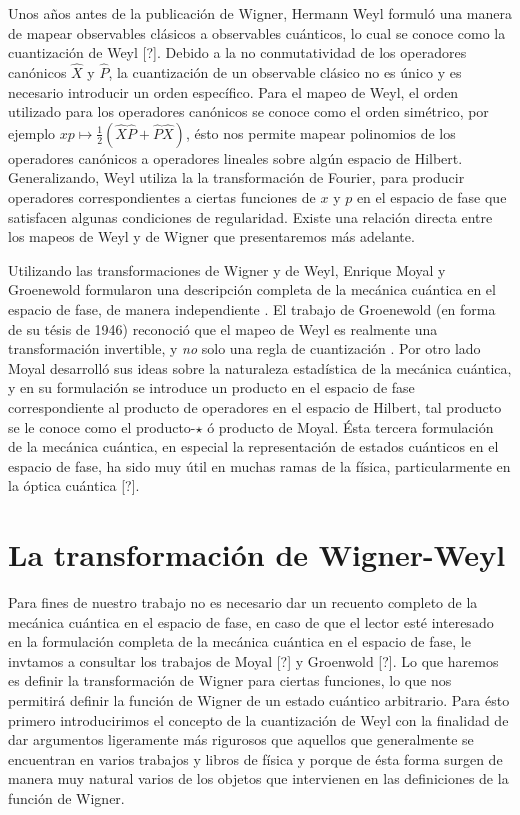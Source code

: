 \documentclass[a4paper]{report}
\begin{document}
  Unos años antes de la publicación de Wigner, Hermann Weyl
  formuló una manera de mapear observables clásicos a
  observables cuánticos, lo cual se conoce como la
  cuantización de Weyl [?]. Debido a la no conmutatividad de
  los operadores canónicos $\hat X$ y $\hat P$, la
  cuantización de un observable clásico no es único y es
  necesario introducir un orden específico. Para el mapeo de
  Weyl, el orden utilizado para los operadores canónicos se
  conoce como el orden simétrico, por ejemplo $xp \mapsto
  \frac{1}{2}\left( \hat{X} \hat{P} + \hat{P} \hat{X}
  \right)$, ésto nos permite mapear polinomios de los
  operadores canónicos a operadores lineales sobre algún
  espacio de Hilbert. Generalizando, Weyl utiliza la la
  transformación de Fourier, para producir operadores
  correspondientes a ciertas funciones de $x$ y $p$ en el
  espacio de fase que satisfacen algunas condiciones de
  regularidad. Existe una relación directa entre los mapeos
  de Weyl y de Wigner que presentaremos más adelante. 

  Utilizando las transformaciones de Wigner y de Weyl,
  Enrique Moyal y Groenewold formularon una descripción
  completa de la mecánica cuántica en el espacio de fase, de
  manera independiente
  \cite{curtrightQuantumMechanicsPhase2012}.  El trabajo de
  Groenewold (en forma de su tésis de 1946) reconoció que el
  mapeo de Weyl es realmente una transformación invertible,
  y \textit{no} solo una regla de cuantización
  \cite{todorovQuantizationMystery2012}. Por otro lado Moyal
  desarrolló sus ideas sobre la naturaleza estadística de la
  mecánica cuántica, y en su formulación se introduce un
  producto en el espacio de fase correspondiente al producto
  de operadores en el espacio de Hilbert, tal producto se le
  conoce como el producto-$\star$ ó producto de Moyal. Ésta
  tercera formulación de la mecánica cuántica, en especial
  la representación de estados cuánticos en el espacio de
  fase, ha sido muy útil en muchas ramas de la física,
  particularmente en la óptica cuántica [?].

  \section{La transformación de Wigner-Weyl}

  Para fines de nuestro trabajo no es necesario dar un
  recuento completo de la mecánica cuántica en el espacio de
  fase, en caso de que el lector esté interesado en la
  formulación completa de la mecánica cuántica en el espacio
  de fase, le invtamos a consultar los trabajos de Moyal [?]
  y Groenwold [?]. Lo que haremos es definir la
  transformación de Wigner para ciertas funciones, lo que
  nos permitirá definir la función de Wigner de un estado
  cuántico arbitrario. Para ésto primero introducirimos el
  concepto de la cuantización de Weyl con la finalidad de
  dar argumentos ligeramente más rigurosos que aquellos que
  generalmente se encuentran en varios trabajos y libros de
  física y porque de ésta forma surgen de manera muy natural
  varios de los objetos que intervienen en las definiciones
  de la función de Wigner.
\end{document}
